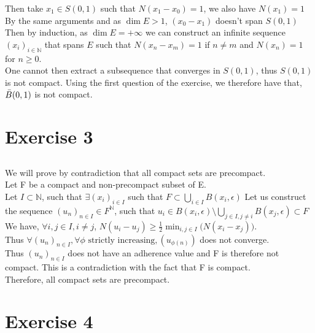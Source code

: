 \documentclass{article}
\begin{document}
\noindent Then take $x_1 \in S(0,1)$ such that $N(x_1-x_0)=1$, we also have $N(x_1)=1$ \\
By the same arguments and as $\dim E > 1$, $(x_0 - x_1)$ doesn't span $S(0,1)$ \\

\noindent Then by induction, as $\dim E = + \infty$ we can construct an infinite sequence $(x_i)_{i \in \mathbb{N}}$ that spans $E$ such that $N(x_n - x_m) = 1$ if $n \neq m$ and $N(x_n) = 1$ for $n \geq 0$.\\

\noindent One cannot then extract a subsequence that converges in $S(0,1)$, thus $S(0,1)$ is not compact. Using the first question of the exercise, we therefore have that, $\Bar{B}(0,1)$ is not compact. 


\section{Exercise 3}
\subsection{} %
We will prove by contradiction that all compact sets are precompact. \\

\noindent Let F be a compact and non-precompact subset of E.\\
Let $I \subset \mathbb{N}$, such that $\exists (x_i)_{i \in I}$ such that $F\subset\bigcup\limits_{i\in I}B(x_i, \epsilon)$ 
Let us construct the sequence $(u_n)_{n \in I} \in F^{\mathbb{N}}$, such that $u_i \in B(x_i,\epsilon) \setminus \bigcup \limits_{j\in I, j \neq i}B(x_j, \epsilon) \subset F$ \\
We have, $\forall i,j \in I,i \neq j$, $N(u_i-u_j) \geq \frac{1}{2} \min_{i,j \in I}\big( N(x_i-x_j)\big)$.\\
Thus $\forall (u_n)_{n \in I}, \forall \phi \text{ strictly increasing}, (u_{\phi(n)})$ does not converge.\\
Thus $(u_n)_{n \in I}$ does not have an adherence value and F is therefore not compact. This is a contradiction with the fact that F is compact.\\
Therefore, all compact sets are precompact.\\


\section{Exercise 4}
\end{document}
